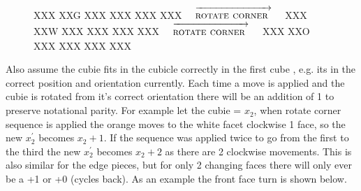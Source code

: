 \documentclass{article}
\begin{document}
\newcommand{\rotatecorner}{[rotatecorner],F2,F2}%
\newcommand{\rotatecornerarr}{$\quad\overrightarrow{\strut\textsc{rotate corner }}\quad$}
\begin{figure}[hbt]
\centering
  \RubikCubeSolved%
   {X}{X}{X} {X}{X}{G}%
   {X}{X}{X} {X}{X}{X}%
   {X}{X}{X} {X}{X}{X}%
  \rotatecornerarr
  \RubikRotation{\rotatecorner}
   {X}{X}{X} {X}{X}{W}%
   {X}{X}{X} {X}{X}{X}%
   {X}{X}{X} {X}{X}{X}%
  \rotatecornerarr
   {X}{X}{X} {X}{X}{O}%
   {X}{X}{X} {X}{X}{X}%
   {X}{X}{X} {X}{X}{X}%
\end{figure}
\vspace{20pt}
Also assume the cubie fits in the cubicle correctly in the first cube , e.g. its in the correct position and orientation currently. Each time a move is applied and the cubie is rotated from it's correct orientation there will be an addition of 1 to preserve notational parity. For example let the cubie = $x_2$, when rotate corner sequence is applied the orange moves to the white facet clockwise 1 face, so the new $x_2^{'}$ becomes $x_2 + 1$. If the sequence was applied twice to go from the first to the third the new $x_2^{'}$ becomes $x_2 + 2$ as there are 2 clockwise movements. This is also similar for the edge pieces, but for only 2 changing faces there will only ever be a +1 or +0 (cycles back).
As an example the front face turn is shown below.


\end{document}
